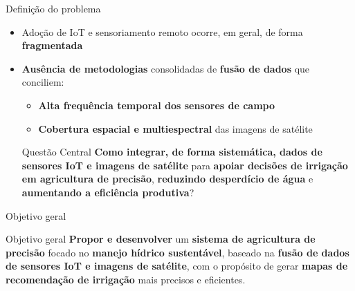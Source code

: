 \documentclass[aspectratio=169]{beamer}
\begin{document}
\begin{frame}{Definição do problema}
  \begin{itemize}
    \item Adoção de IoT e sensoriamento remoto ocorre, em geral, de forma \textbf{fragmentada}
    \item \textbf{Ausência de metodologias} consolidadas de \textbf{fusão de dados} que conciliem:
      \begin{itemize}
        \item \textbf{Alta frequência temporal dos sensores de campo}
        \item \textbf{Cobertura espacial e multiespectral} das imagens de satélite
      \end{itemize}
    
    \begin{alertblock}{Questão Central}
      \textbf{Como integrar, de forma sistemática, dados de sensores IoT e imagens de satélite}
      para \textbf{apoiar decisões de irrigação em agricultura de precisão}, \textbf{reduzindo desperdício de
      água} e \textbf{aumentando a eficiência produtiva}?
    \end{alertblock}
  \end{itemize}
\end{frame}

\begin{frame}{Objetivo geral}
  \begin{block}{Objetivo geral}
    \textbf{Propor e desenvolver} um \textbf{sistema de agricultura de precisão} focado no \textbf{manejo hídrico
    sustentável}, baseado na \textbf{fusão de dados de sensores IoT e imagens de satélite}, com o
    propósito de gerar \textbf{mapas de recomendação de irrigação} mais precisos e eficientes.
  \end{block}
  
  
\end{frame}
\end{document}
